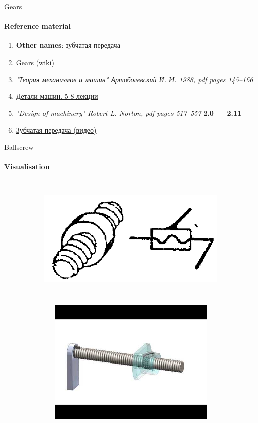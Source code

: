 \documentclass[aspectratio=169]{beamer}
\begin{document}
\begin{frame}[t]{Gears}
    \framesubtitle{Reference material}
    \begin{enumerate}
        \item \textbf{Other names}: зубчатая передача
        \item \href{https://en.wikipedia.org/wiki/Gear}{Gears (wiki)}
        \item \textit{"Теория механизмов и машин" Артоболевский И. И. 1988, pdf pages 145--166 }
        \item \href{https://studfile.net/preview/2156468/}{Детали машин. 5-8 лекции}
        \item \textit{"Design of machinery" Robert L. Norton, pdf pages 517--557 } \textbf{2.0 --- 2.11}
        \item \href{https://youtu.be/ThVIKgBucUk}{Зубчатая передача (видео)}
    \end{enumerate}
\end{frame}

\begin{frame}[t]{Ballscrew}
    \framesubtitle{Visualisation}
    \vspace{-0.5cm}
    \begin{figure}[H]
        \begin{subfigure}{0.49\textwidth}
            \centering\includegraphics[height=6cm,width=1\textwidth,keepaspectratio]{H_sd.png}
        \end{subfigure}
        \begin{subfigure}{0.49\textwidth}
            \href{https://www.youtube.com/watch?v=oEPrXljqeHA}{
                \centering\includegraphics[height=6cm,width=1\textwidth,keepaspectratio]{ballscrew_preview.jpg}}
        \end{subfigure}
    \end{figure} 
\end{frame}
\end{document}
